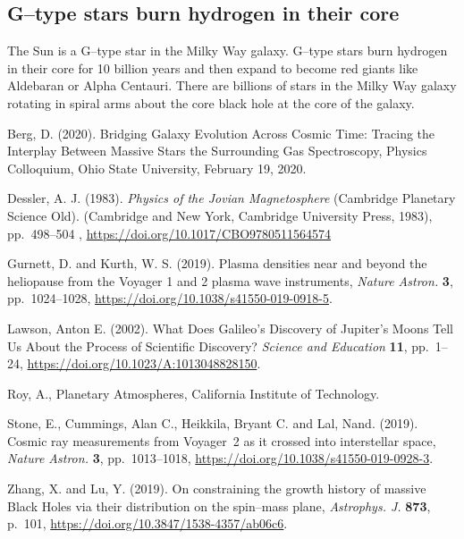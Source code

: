 \documentclass[a4paper,openany,12pt]{book}
\begin{document}
%

\subsection{G--type stars burn hydrogen in their core}

The Sun is a G--type star in the Milky Way galaxy. G--type stars burn hydrogen in their core for 10 billion years and then expand to become red giants like Aldebaran or Alpha Centauri. There are billions of stars in the Milky Way galaxy rotating in spiral arms about the core black hole at the core of the galaxy.

\begin{thebibliography}{100}

\bibitem{}
Berg, D.  (2020). Bridging Galaxy Evolution Across Cosmic Time: Tracing the Interplay Between Massive Stars the Surrounding Gas Spectroscopy, Physics Colloquium, Ohio State University, February 19, 2020.

\bibitem{}
Dessler, A. J. (1983).  \emph{Physics of the Jovian Magnetosphere} (Cambridge Planetary Science Old). (Cambridge and New York, Cambridge University Press, 1983), pp.~498--504 , \url{https://doi.org/10.1017/CBO9780511564574}

\bibitem{}
Gurnett, D. and Kurth, W. S. (2019). Plasma densities near and beyond the heliopause from the Voyager 1 and 2 plasma wave instruments, \emph{Nature Astron.} \textbf{3}, pp.~1024--1028, 
\url{https://doi.org/10.1038/s41550-019-0918-5}.

\bibitem{}
Lawson, Anton E. (2002). What Does Galileo's Discovery of Jupiter's Moons Tell Us About the Process of Scientific Discovery? \emph{Science and Education} \textbf{11}, pp.~1--24, \url{https://doi.org/10.1023/A:1013048828150}.

\bibitem{}
Roy, A., Planetary Atmospheres, California Institute of Technology.

\bibitem{}
Stone, E., Cummings, Alan C., Heikkila, Bryant C. and Lal, Nand. (2019). Cosmic ray measurements from Voyager~2 as it crossed into interstellar space, \emph{Nature Astron.} \textbf{3}, pp.~1013--1018, \url{https://doi.org/10.1038/s41550-019-0928-3}.

\bibitem{}
Zhang, X. and Lu, Y. (2019). On constraining the growth history of massive Black Holes via their distribution on the spin--mass plane, {\it Astrophys. J.} \textbf{873}, p.~101, \url{https://doi.org/10.3847/1538-4357/ab06c6}.

\end{thebibliography}
\end{document}
